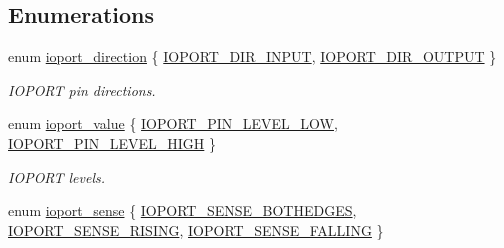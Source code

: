 \subsection*{Enumerations}
\begin{DoxyCompactItemize}
\item 
enum \hyperlink{group__ioport__group_ga9c267f89800e58bd9dfd74e662a4a4c1}{ioport\-\_\-direction} \{ \hyperlink{group__ioport__group_gga9c267f89800e58bd9dfd74e662a4a4c1af854a0dce084e5a8e8744f9a502e7b7b}{I\-O\-P\-O\-R\-T\-\_\-\-D\-I\-R\-\_\-\-I\-N\-P\-U\-T}, 
\hyperlink{group__ioport__group_gga9c267f89800e58bd9dfd74e662a4a4c1a06de24313dad0169f3a366c62a84f4cc}{I\-O\-P\-O\-R\-T\-\_\-\-D\-I\-R\-\_\-\-O\-U\-T\-P\-U\-T}
 \}
\begin{DoxyCompactList}\small\item\em I\-O\-P\-O\-R\-T pin directions. \end{DoxyCompactList}\item 
enum \hyperlink{group__ioport__group_gaed084e0b73201e5391dd37f484041a31}{ioport\-\_\-value} \{ \hyperlink{group__ioport__group_ggaed084e0b73201e5391dd37f484041a31a2a406eb5dcf70b9bcadc61d3d7cec65b}{I\-O\-P\-O\-R\-T\-\_\-\-P\-I\-N\-\_\-\-L\-E\-V\-E\-L\-\_\-\-L\-O\-W}, 
\hyperlink{group__ioport__group_ggaed084e0b73201e5391dd37f484041a31a94f879952a99f7f19eb1ba87c6844082}{I\-O\-P\-O\-R\-T\-\_\-\-P\-I\-N\-\_\-\-L\-E\-V\-E\-L\-\_\-\-H\-I\-G\-H}
 \}
\begin{DoxyCompactList}\small\item\em I\-O\-P\-O\-R\-T levels. \end{DoxyCompactList}\item 
enum \hyperlink{group__ioport__group_ga8c5d67795f1836c65f568e11d7cb9bd9}{ioport\-\_\-sense} \{ \hyperlink{group__ioport__group_gga8c5d67795f1836c65f568e11d7cb9bd9a29c5f09354671130c3c72705117b7f92}{I\-O\-P\-O\-R\-T\-\_\-\-S\-E\-N\-S\-E\-\_\-\-B\-O\-T\-H\-E\-D\-G\-E\-S}, 
\hyperlink{group__ioport__group_gga8c5d67795f1836c65f568e11d7cb9bd9a65c95c9bea4a4c84749af3eba660d654}{I\-O\-P\-O\-R\-T\-\_\-\-S\-E\-N\-S\-E\-\_\-\-R\-I\-S\-I\-N\-G}, 
\hyperlink{group__ioport__group_gga8c5d67795f1836c65f568e11d7cb9bd9adbf4e5509f715da8c470405785bb81f4}{I\-O\-P\-O\-R\-T\-\_\-\-S\-E\-N\-S\-E\-\_\-\-F\-A\-L\-L\-I\-N\-G}
 \}
\end{DoxyCompactItemize}
